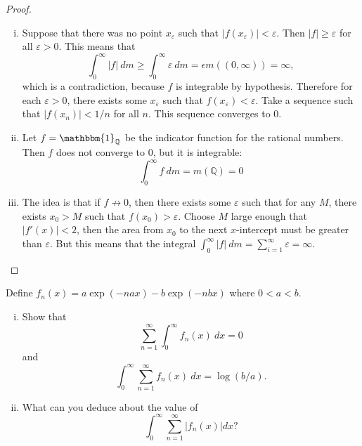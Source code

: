 \documentclass{article}
\newenvironment{problem}[2][Problem]{\begin{trivlist}
\item[\hskip \labelsep {\bfseries #1}\hskip \labelsep {\bfseries #2.}]}{\end{trivlist}}
\begin{document}
\begin{proof}
  \begin{enumerate}[(i)]
      \item Suppose that there was no point $x_\varepsilon$ such that $|f(x_\varepsilon)| < \varepsilon$. Then $|f| \geq \varepsilon$ for all $\varepsilon > 0$. This means that \[
          \int_{0}^{\infty} |f|\ dm \geq \int_{0}^{\infty} \varepsilon\ dm = \epsilon m((0, \infty)) = \infty,
        \] which is a contradiction, because $f$ is integrable by hypothesis.
        Therefore for each $\varepsilon > 0$, there exists some $x_\varepsilon$ such that $f(x_\varepsilon) < \varepsilon$. Take a sequence such that $|f(x_n)| < 1/n$ for all $n$. This sequence converges to 0.
        \item Let $f = \mathbbm{1}_{\mathbb{Q}}$ be the indicator function for the rational numbers. Then $f$ does not converge to $0$, but it is integrable: \[
          \int_0^\infty f\ dm =
            m(\mathbb{Q}) =
            0
        \]
        \item The idea is that if $f \not\rightarrow 0$, then there exists some $\varepsilon$ such that for any $M$, there exists $x_0 > M$ such that $f(x_0) > \varepsilon$. Choose $M$ large enough that $|f'(x)| < 2$, then the area from $x_0$ to the next $x$-intercept must be greater than $\varepsilon$. But this means that the integral $\int_0^\infty |f|\ dm = \sum_{i = 1}^{\infty} \varepsilon = \infty$.
    \end{enumerate}
\end{proof}

\pagebreak

\begin{problem}{3} Define $f_n(x) = a\exp(-nax)-b\exp(-nbx)$ where $0 < a < b$.
  \begin{enumerate}[(i)]
      \item Show that \[
          \sum_{n = 1}^{\infty} \int_{0}^{\infty} f_n(x)\ dx = 0
        \] and \[
          \int_{0}^{\infty} \sum_{n = 1}^{\infty} f_n(x)\ dx = \log(b/a).
        \]
        \item What can you deduce about the value of \[
          \int_{0}^{\infty} \sum_{n = 1}^{\infty} \left|f_n(x)\right| dx?
        \]
    \end{enumerate}
\end{problem}
\end{document}
